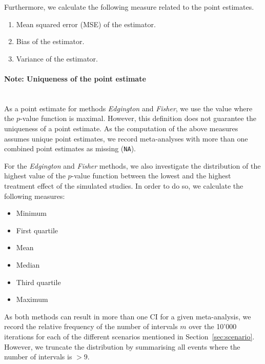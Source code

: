 \documentclass[letterpaper, 12pt]{article}
\begin{document}
Furthermore, we calculate the following measure related to the point estimates.

\begin{enumerate}
  \item Mean squared error (MSE) of the estimator.
  \item Bias of the estimator.
  \item Variance of the estimator.
\end{enumerate}

\paragraph{Note: Uniqueness of the point estimate}\mbox{}\\
As a point estimate for methods \emph{Edgington} and \emph{Fisher}, we use the
value where the $p$-value function is maximal. However, this definition does not
guarantee the uniqueness of a point estimate. As the computation of the above
measures assumes unique point estimates, we record meta-analyses with more than
one combined point estimates as missing (\texttt{NA}).

\vspace*{.5cm}

For the \emph{Edgington} and \emph{Fisher} methods, we also investigate the
distribution of the highest value of the $p$-value function between the lowest
and the highest treatment effect of the simulated studies. In order to do so,
we calculate the following measures:

\begin{itemize}
\item Minimum
\item First quartile
\item Mean
\item Median
\item Third quartile
\item Maximum
\end{itemize}

\vspace*{.5cm}

As both methods can result in more than one CI for a given meta-analysis,
we record the relative frequency of the number of intervals $m$ over the
10'000 iterations for each of the different scenarios mentioned in
Section~\ref{sec:scenario}. However, we truncate the distribution
by summarising all events where the number of intervals is $> 9$.
\end{document}

